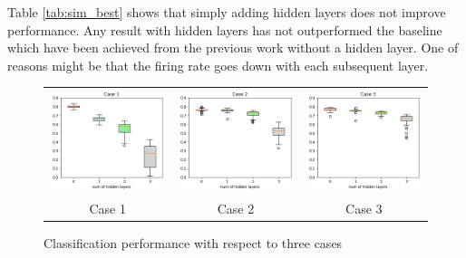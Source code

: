 \documentclass[sigconf]{acmart}
\begin{document}
Table \ref{tab:sim_best} shows that simply adding hidden layers does not improve performance. Any result with hidden layers has not outperformed the baseline which have been achieved from the previous work \cite{hopkins2018spiking} without a hidden layer.
One of reasons might be that the firing rate goes down with each subsequent layer.

\begin{figure}[tbh]
    \centering
    \begin{centering}
    \begin{tabular}{ccc}
        \includegraphics[width=0.30\linewidth, trim=0cm 0cm 0cm 0.65cm, clip=true]{10trials/boxPlotHlayersC1}&
        \includegraphics[width=0.30\linewidth, trim=0cm 0cm 0cm 0.65cm, clip=true]{10trials/boxPlotHlayersC2}&
        \includegraphics[width=0.30\linewidth, trim=0cm 0cm 0cm 0.65cm, clip=true]{10trials/boxPlotHlayersC3}\\
        Case 1 & Case 2 & Case 3
        \end{tabular}
     \end{centering}
     \caption{Classification performance with respect to three cases}
     \label{fig:bpTtime}
    \vspace{-10pt}
\end{figure}
\end{document}
